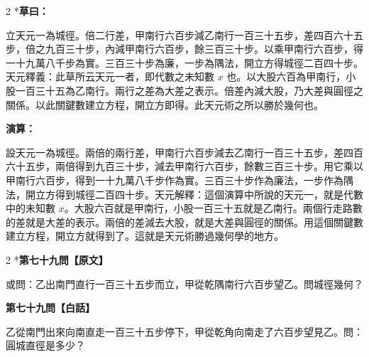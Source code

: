 \documentclass[11pt,a4paper]{article}
\begin{document}
\begin{paracol}{2}
\switchcolumn[0]*\textbf{草曰：}

\small 立天元一為城徑。倍二行差，甲南行六百步減乙南行一百三十五步，差四百六十五步，倍之九百三十步，內減甲南行六百步，餘三百三十步。以乘甲南行六百步，得一十九萬八千步為實。三百三十步為廉，一步為隅法，開立方得城徑二百四十步。天元釋義：此草所云天元一者，即代數之未知數 $x$ 也。以大股六百為甲南行，小股一百三十五為乙南行。兩行之差為大差之表示。倍差內減大股，乃大差與圓徑之關係。以此關鍵數建立方程，開立方即得。此天元術之所以勝於幾何也。

\switchcolumn\textbf{演算：}

\small 設天元一為城徑。兩倍的兩行差，甲南行六百步減去乙南行一百三十五步，差四百六十五步，兩倍得到九百三十步，減去甲南行六百步，餘數三百三十步。用它乘以甲南行六百步，得到一十九萬八千步作為實。三百三十步作為廉法，一步作為隅法，開立方得到城徑二百四十步。天元解釋：這個演算中所說的天元一，就是代數中的未知數 $x$。大股六百就是甲南行，小股一百三十五就是乙南行。兩個行走路數的差就是大差的表示。兩倍的差減去大股，就是大差與圓徑的關係。用這個關鍵數建立方程，開立方就得到了。這就是天元術勝過幾何學的地方。
\end{paracol}

\vspace{0.1cm}
\noindent{}
\par\vspace{0.3cm}

\begin{paracol}{2}
\switchcolumn[0]*\noindent\textbf{第七十九問【原文】}

\small 或問：乙出南門直行一百三十五步而立，甲從乾隅南行六百步望乙。問城徑幾何？

\switchcolumn\noindent\textbf{第七十九問【白話】}

\small 乙從南門出來向南直走一百三十五步停下，甲從乾角向南走了六百步望見乙。問：圓城直徑是多少？
\end{paracol}

\vspace{0.1cm}
\noindent{}
\par\vspace{0.15cm}
\end{document}
